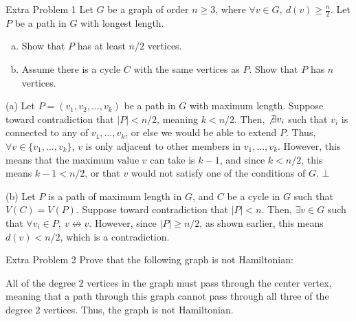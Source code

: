 \documentclass[9pt]{extarticle}
\begin{document}
  \begin{problem}{Extra Problem 1}
    Let $G$ be a graph of order $n\geq 3$, where $\forall v\in G,~d(v) \geq \frac{n}{2}$. Let $P$ be a path in $G$ with longest length.
    \begin{enumerate}[(a)]
      \item Show that $P$ has at least $n/2$ vertices.
      \item Assume there is a cycle $C$ with the same vertices as $P$. Show that $P$ has $n$ vertices.
    \end{enumerate}
    \tcblower
    \begin{problem}{(a)}
      Let $P = (v_1,v_2,\dots,v_k)$ be a path in $G$ with maximum length. Suppose toward contradiction that $|P| < n/2$, meaning $k< n/2$. Then, $\not\exists v_i$ such that $v_i$ is connected to any of $v_1,\dots,v_k$, or else we would be able to extend $P$. Thus, $\forall v\in \{v_1,\dots,v_k\}$, $v$ is only adjacent to other members in $v_1,\dots,v_k$. However, this means that the maximum value $v$ can take is $k-1$, and since $k < n/2$, this means $k-1 < n/2$, or that $v$ would not satisfy one of the conditions of $G$. $\bot$
    \end{problem}
    \begin{problem}{(b)}
      Let $P$ is a path of maximum length in $G$, and $C$ be a cycle in $G$ such that $V(C) = V(P)$. Suppose toward contradiction that $|P| < n$. Then, $\exists v\in G$ such that $\forall v_i\in P,~v\not\leftrightarrow v$. However, since $|P| \geq n/2$, as shown earlier, this means $d(v) < n/2$, which is a contradiction.
    \end{problem}
  \end{problem}
  \begin{problem}{Extra Problem 2}
    Prove that the following graph is not Hamiltonian:
    \begin{center}
    \end{center}
    \tcblower
    All of the degree $2$ vertices in the graph must pass through the center vertex, meaning that a path through this graph cannot pass through all three of the degree $2$ vertices. Thus, the graph is not Hamiltonian.
  \end{problem}
\end{document}
